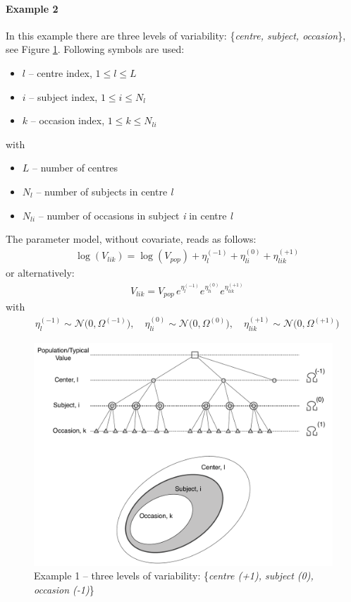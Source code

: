 \paragraph{Example 2}
In this example there are three levels of variability: \{\textit{centre, subject, occasion}\}, see Figure \ref{tree_IOV1}. Following symbols are used:
\begin{itemize}
\item
$l$ -- centre index, $1\le l \le L$
\item
$i$ -- subject index, $1\le i \le N_l$
\item
$k$ -- occasion index, $1\le k \le N_{li}$
\end{itemize} 
with
\begin{itemize}
\item
$L$ -- number of centres
\item
$N_l$ -- number of subjects in centre \textit{l}
\item
$N_{li}$ -- number of occasions in subject \textit{i} in centre \textit{l}
\end{itemize} 
The parameter model, without covariate, reads as follows:
\begin{align*}
& \log(V_{lik}) = \log(V_{pop}) + \eta_l^{(-1)} + \eta_{li}^{(0)} + \eta_{lik}^{(+1)}  
\end{align*} 
or alternatively:
\begin{align*}
& V_{lik} = V_{pop} \, e^{\eta_l^{(-1)}} e^{\eta_{li}^{(0)}} e^{\eta_{lik}^{(+1)}}  
\end{align*} 
with
\begin{align*}
 & \eta_l^{(-1)} \sim \mathcal{N}\big(0,\Omega^{(-1)}\big), \quad \eta_{li}^{(0)} \sim \mathcal{N}\big(0,\Omega^{(0)}\big),
\quad \eta_{lik}^{(+1)} \sim \mathcal{N}\big(0,\Omega^{(+1)}\big) 
\end{align*}


\begin{figure}[htb!]
\centering
  \includegraphics[width=120mm]{pics/tree_IOV1}
 \caption{Example 1 -- three levels of variability: \{\textit{centre (+1), subject (0), occasion (-1)}\}}
 \label{tree_IOV1}
\end{figure}


